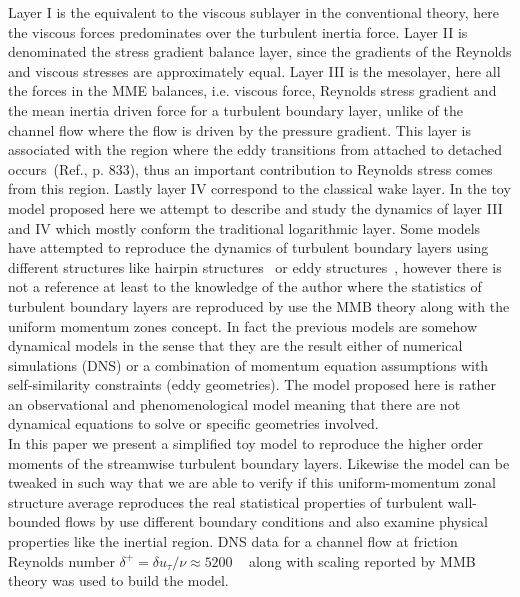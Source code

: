 \documentclass[aps,reprint,amsmath,amssymb,pra,floatfix]{revtex4-1}%
\begin{document}
Layer I is the equivalent to the viscous sublayer in the conventional theory, here the viscous forces predominates over the turbulent inertia force. Layer II is denominated the stress gradient balance layer, since  the gradients of the Reynolds and viscous stresses are approximately equal. Layer III is the mesolayer, here all the forces in the MME balances, i.e. viscous force, Reynolds stress gradient and the mean inertia driven force for a turbulent boundary layer, unlike of the channel flow where the flow is driven by the pressure gradient. This layer is associated with the region where the eddy transitions from attached to detached occurs~(Ref.\citep{Klewickimmb}, p. 833), thus an important contribution to Reynolds stress comes from this region. Lastly layer IV correspond to the classical wake layer. In the toy model proposed here we attempt to describe and study the dynamics of layer III and IV which mostly conform the traditional logarithmic layer. Some models have attempted to reproduce the dynamics of turbulent boundary layers using different structures like hairpin structures~\citep{adrian2007} or eddy structures~\citep{perry1995}, however there is not a reference at least to the knowledge of the author where the statistics of turbulent boundary layers are reproduced by use the MMB theory along with the uniform momentum zones concept. In fact the previous models are somehow dynamical models in the sense that they are the result either of numerical simulations (DNS) or a combination of momentum equation assumptions with self-similarity constraints (eddy geometries). The model proposed here is rather an observational and phenomenological model meaning that there are not dynamical equations to solve or specific geometries involved.\\
In this paper we present a simplified toy model to reproduce the higher order moments of the streamwise turbulent boundary layers. Likewise the model can be tweaked in such way that we are able to verify if this uniform-momentum zonal structure average reproduces the real statistical properties of turbulent wall-bounded flows by use different boundary conditions  and also examine physical properties like the inertial region.  DNS data for a channel flow at friction Reynolds number $\delta^+=\delta u_{\tau}/\nu\approx 5200$ ~\cite{leemoser2015}  along with scaling reported by MMB theory was used to build the model. 
\end{document}

